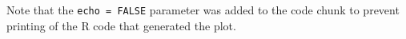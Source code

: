 Note that the \texttt{echo\ =\ FALSE} parameter was added to the code
chunk to prevent printing of the R code that generated the plot.


\address{%
Alex Fung\\
\\
\\
}


\address{%
Viswesh Krishnamurthy\\
\\
\\
}


\address{%
Tony Lee\\
\\
\\
}


\address{%
Patrick Osborne\\
\\
\\
}


